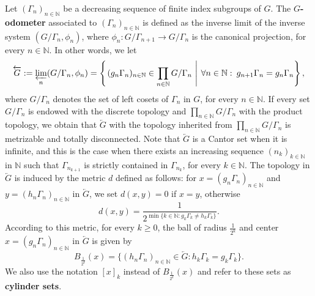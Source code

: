 \documentclass[titlepage,reqno,10pt]{amsart}
\theoremstyle{definition}
\def\N{{\mathbb N}}
\begin{document}
Let $(\Gamma_n)_{n\in\mathbb{N}}$ be a decreasing sequence of finite index subgroups of $G$. 
The {\bf $G$-odometer} associated to $(\Gamma_n)_{n\in\mathbb{N}}$ is defined as the inverse limit of the inverse system $(G/\Gamma_n,\phi_n)$, where $\phi_n:G/\Gamma_{n+1}\to G/\Gamma_n$ is the canonical projection, for every $n\in \mathbb{N}$. In other words, we let 
\begin{align*}
    \overleftarrow{G}:=\varprojlim_n(G/\Gamma_n,\phi_n)=\left\{\left.(g_n\Gamma_n)_{n\in\mathbb{N}}\in\prod_{n\in\mathbb{N}}G/\Gamma_n\ \right| \:\forall n \in \N:\: g_{n+1}\Gamma_n=g_n\Gamma_n\right\},
\end{align*}
where $G/\Gamma_n$ denotes the set of left cosets of $\Gamma_n$ in $G$, for every $n\in\mathbb{N}$.
If every set $G/\Gamma_n$ is endowed with the discrete topology and $\prod_{n\in\mathbb{N}}G/\Gamma_n$ with the product topology, we obtain that $\overleftarrow{G}$ with the topology inherited from $\prod_{n\in\mathbb{N}}G/\Gamma_n$ is metrizable and totally disconnected. 
Note that $\overleftarrow{G}$ is a Cantor set when it is infinite, and this is the case when there exists an increasing sequence $(n_k)_{k\in\mathbb{N}}$ in $\mathbb{N}$ such that $\Gamma_{n_{k+1}}$ is strictly contained in $\Gamma_{n_k}$, for every $k\in \mathbb{N}$. The topology in $\overleftarrow{G}$ is induced by the metric $d$ defined as follows: for $x=(g_n\Gamma_n)_{n\in\mathbb{N}}$ and $y=(h_n\Gamma_n)_{n\in\mathbb{N}}$ in $\overleftarrow{G}$,   we set $d(x,y)=0$ if $x=y$, otherwise
\begin{equation}\label{eq: metric odometer}
d(x,y)=\frac{1}{2^{\min\{k\in\mathbb{N}: g_k\Gamma_k\neq h_k\Gamma_k\}}}.
\end{equation}
According to this metric, for every $k\geq 0$, the ball of radius $\frac{1}{2^k}$ and center $x=(g_n\Gamma_n)_{n\in\mathbb{N}}$ in $\overleftarrow{G}$ is given by
$$
B_{\frac{1}{2^k}}(x)=\{(h_n\Gamma_n)_{n\in\mathbb{N}}\in \overleftarrow{G}: h_k\Gamma_k=g_k\Gamma_k\}.
$$
We also use the notation $[x]_k$ instead of $B_\frac{1}{2^k}(x)$ and refer to these sets as \textbf{cylinder sets}.%
\end{document}
